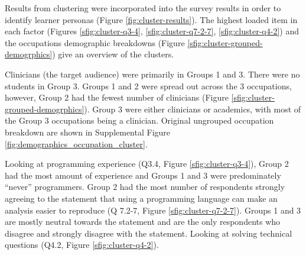 \documentclass[020-persona\_validation.tex]{subfiles}
\begin{document}
        Results from clustering were incorporated into the survey results in order to identify learner personas
        (Figure \ref{fig:cluster-results}).
        The highest loaded item in each factor
        (Figures \ref{sfig:cluster-q3-4}, \ref{sfig:cluster-q7-2-7}, \ref{sfig:cluster-q4-2})
        and the occupations demographic breakdowns
        (Figure \ref{sfig:cluster-grouped-demogrphics})
        give an overview of the clusters.

        Clinicians (the target audience) were primarily in Groups 1 and 3.
        There were no students in Group 3.
        Groups 1 and 2 were spread out across the 3 occupations,
        however,
        Group 2 had the fewest number of clinicians (Figure \ref{sfig:cluster-grouped-demogrphics}).
        Group 3 were either clinicians or academics, with most of the Group 3 occupations being a clinician.
        Original ungrouped occupation breakdown are shown in Supplemental Figure \ref{fig:demographics_occupation_cluster}.

        Looking at programming experience
        (Q3.4, Figure \ref{sfig:cluster-q3-4}),
        Group 2 had the most amount of experience
        and Groups 1 and 3 were predominately ``never'' programmers.
        Group 2 had the most number of respondents strongly agreeing to the statement that
        using a programming language can make an analysis easier to reproduce
        (Q 7.2-7, Figure \ref{sfig:cluster-q7-2-7}).
        Groups 1 and 3 are mostly neutral towards the statement and are the only respondents who disagree and strongly disagree
        with the statement.
        Looking at solving technical questions
        (Q4.2, Figure \ref{sfig:cluster-q4-2}).
\end{document}
